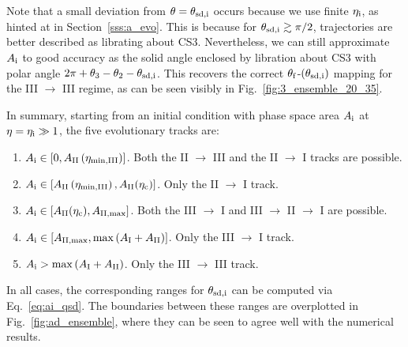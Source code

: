 \documentclass[
        fleqn,
        usenatbib,
    ]{mnras}
\newcommand*{\p}[1]{\left(#1\right)}
\newcommand*{\s}[1]{\left[#1\right]}
\begin{document}
\begin{enumerate}
        Note that a small deviation from $\theta = \theta_{\rm sd, i}$ occurs
        because we use finite $\eta_{\rm i}$, as hinted at in
        Section~\ref{sss:a_evo}. This is because for $\theta_{\rm sd, i}
        \gtrsim \pi/2$, trajectories are better described as librating about
        CS3. Nevertheless, we can still approximate $A_{\rm i}$ to good
        accuracy as the solid angle enclosed by libration about CS3 with polar
        angle $2\pi + \theta_3 - \theta_2 - \theta_{\rm sd, i}$. This recovers
        the correct $\theta_{\rm f}$-$\p{\theta_{\rm sd, i}}$ mapping for the
        III $\to$ III regime, as can be seen visibly in
        Fig.~\ref{fig:3_ensemble_20_35}.
\end{enumerate}
In summary, starting from an initial condition with phase space area $A_{\rm i}$
at $\eta = \eta_{\rm i} \gg 1$, the five evolutionary tracks are:
\begin{enumerate}
    \item $A_{\rm i} \in \s{0, A_{\rm II}\p{\eta_{\rm \min, III}}}$. Both the II
        $\to$ III and the II $\to$ I tracks are possible.

    \item $A_{\rm i} \in \s{A_{\rm II}\p{\eta_{\rm \min, III}}, A_{\rm
        II}(\eta_{\rm c})}$. Only the II $\to$ I track.

    \item $A_{\rm i} \in \s{A_{\rm II}(\eta_{\rm c}), A_{\rm II, \max}}$.
        Both the III $\to$ I and III $\to$ II $\to$ I  are possible.

    \item $A_{\rm i} \in \s{A_{\rm II, \max}, \max \p{A_{\rm I} + A_{\rm II}}}$.
        Only the III $\to$ I track.

    \item $A_{\rm i} > \max \p{A_{\rm I} + A_{\rm II}}$. Only the III $\to$ III
        track.
\end{enumerate}
In all cases, the corresponding ranges for $\theta_{\rm sd,i}$ can be computed via
Eq.~\eqref{eq:ai_qsd}. The boundaries between these ranges are overplotted in
Fig.~\ref{fig:ad_ensemble}, where they can be seen to agree well with the
numerical results.
\end{document}
